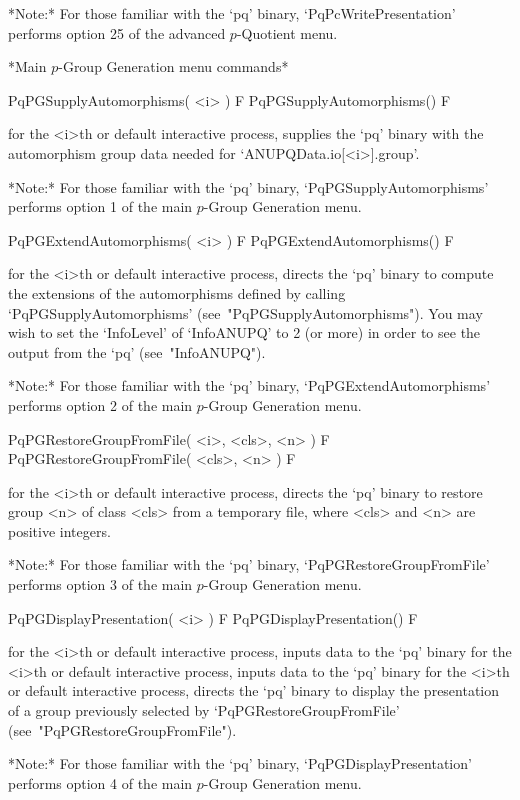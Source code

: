 *Note:* For those familiar with the `pq' binary,  `PqPcWritePresentation'
performs option 25 of the advanced $p$-Quotient menu.

*Main $p$-Group Generation menu commands*

\>PqPGSupplyAutomorphisms( <i> ) F
\>PqPGSupplyAutomorphisms() F

for the <i>th or default interactive {\ANUPQ} process, supplies the  `pq'
binary    with    the    automorphism    group    data     needed     for
`ANUPQData.io[<i>].group'.

*Note:*
For  those  familiar  with  the  `pq'  binary,  `PqPGSupplyAutomorphisms'
performs option 1 of the main $p$-Group Generation menu.

\>PqPGExtendAutomorphisms( <i> ) F
\>PqPGExtendAutomorphisms() F

for the <i>th or default interactive {\ANUPQ} process, directs  the  `pq'
binary to compute the extensions of the automorphisms defined by  calling
`PqPGSupplyAutomorphisms' (see~"PqPGSupplyAutomorphisms"). You  may  wish
to set the `InfoLevel' of `InfoANUPQ' to 2 (or more) in order to see  the
output from the `pq' (see~"InfoANUPQ").

*Note:*    
For  those  familiar  with  the  `pq'  binary,  `PqPGExtendAutomorphisms'
performs option 2 of the main $p$-Group Generation menu. 

\>PqPGRestoreGroupFromFile( <i>, <cls>, <n> ) F
\>PqPGRestoreGroupFromFile( <cls>, <n> ) F

for the <i>th or default interactive {\ANUPQ} process, directs  the  `pq'
binary to restore group <n> of class <cls> from a temporary  file,  where
<cls> and <n> are positive integers.

*Note:* 
For those  familiar  with  the  `pq'  binary,  `PqPGRestoreGroupFromFile'
performs option 3 of the main $p$-Group Generation menu.

\>PqPGDisplayPresentation( <i> ) F
\>PqPGDisplayPresentation() F

for the <i>th or default interactive {\ANUPQ} process, inputs data to the
`pq' binary for the <i>th or default interactive {\ANUPQ} process, inputs
data to the `pq' binary for the <i>th  or  default  interactive  {\ANUPQ}
process, directs the `pq' binary to display the presentation of  a  group
previously         selected         by         `PqPGRestoreGroupFromFile'
(see~"PqPGRestoreGroupFromFile").

*Note:*
For  those  familiar  with  the  `pq'  binary,  `PqPGDisplayPresentation'
performs option 4 of the main $p$-Group Generation menu.

